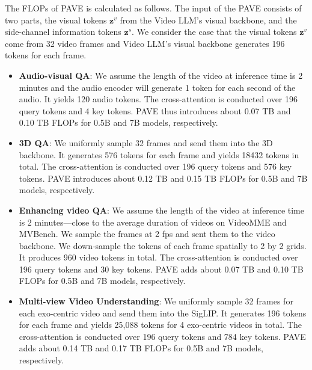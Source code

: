 The FLOPs of PAVE is calculated as follows. The input of the PAVE consists of two parts, the visual tokens $\mathbf{z}^v$ from the Video LLM's visual backbone, and the side-channel information tokens $\mathbf{z}^s$. We consider the case that the visual tokens $\mathbf{z}^v$ come from 32 video frames and Video LLM's visual backbone generates 196 tokens for each frame. 
\begin{itemize}
    \item \textbf{Audio-visual QA}: We assume the length of the video at inference time is 2 minutes and the audio encoder will generate 1 token for each second of the audio. It yields 120 audio tokens. The cross-attention is conducted over 196 query tokens and 4 key tokens. PAVE thus introduces about 0.07 TB and 0.10 TB FLOPs for 0.5B and 7B models, respectively.  
    \item \textbf{3D QA}: We uniformly sample 32 frames and send them into the 3D backbone. It generates 576 tokens for each frame and yields 18432 tokens in total. The cross-attention is conducted over 196 query tokens and 576 key tokens. PAVE introduces about 0.12 TB and 0.15 TB FLOPs for 0.5B and 7B models, respectively.
    \item \textbf{Enhancing video QA}: We assume the length of the video at inference time is 2 minutes---close to the average duration of videos on VideoMME and MVBench. We sample the frames at 2 fps and sent them to the video backbone. We down-sample the tokens of each frame spatially to 2 by 2 grids. It produces 960 video tokens in total. The cross-attention is conducted over 196 query tokens and 30 key tokens. PAVE adds about 0.07 TB and 0.10 TB FLOPs for 0.5B and 7B models, respectively.
    \item \textbf{Multi-view Video Understanding}: We uniformly sample 32 frames for each exo-centric video and send them into the SigLIP. It generates 196 tokens for each frame and yields 25,088 tokens for 4 exo-centric videos in total. The cross-attention is conducted over 196 query tokens and 784 key tokens. PAVE adds about 0.14 TB and 0.17 TB FLOPs for 0.5B and 7B models, respectively.  
\end{itemize}







